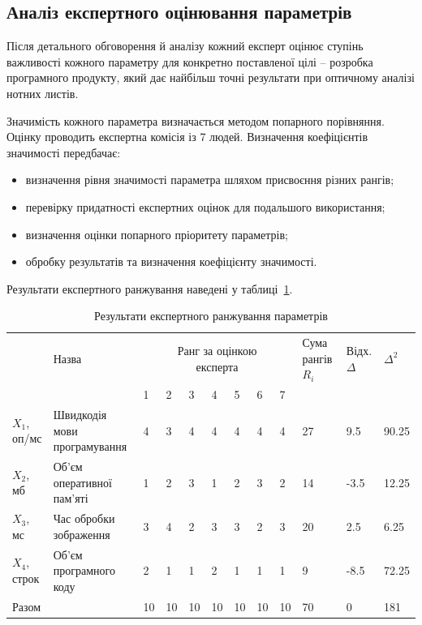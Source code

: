 \subsection{Аналіз експертного оцінювання параметрів}
Після детального обговорення й аналізу кожний експерт оцінює ступінь важливості кожного 
параметру для конкретно поставленої цілі – розробка програмного продукту, який дає найбільш 
точні результати при оптичному аналізі нотних листів.

Значимість кожного параметра визначається методом попарного порівняння. Оцінку проводить експертна комісія із 7 людей. Визначення коефіцієнтів значимості передбачає: 
\begin{itemize}
	\item визначення рівня значимості параметра шляхом присвоєння різних рангів; 
	\item перевірку придатності експертних оцінок для подальшого використання; 
	\item визначення оцінки попарного пріоритету параметрів; 
	\item обробку результатів та визначення коефіцієнту значимості. 
\end{itemize}

Результати експертного ранжування наведені у таблиці~\ref{tab:economics:parameter_range}.

\begin{table}
	\caption{Результати експертного ранжування параметрів}
	\centering
	\begin{tabular}{| m{} | p{} | m{} | m{} | m{} | m{} | m{} | m{} | m{} |	p{}|p{}|p{}|}
	\hline
	\multirow{2}{*}{\rotatebox{90}{Позначення  }} & Назва & \multicolumn{7}{c|}{\parbox[c]{0.3\textwidth}{Ранг за оцінкою\\експерта}} 	& Сума рангів $R_i$ & Відх. $\Delta$ &$\Delta^2 $ \\
	\cline{3-9}
			   & 	   & 1& 2& 3& 4& 5& 6& 7							&					&					&\\ 
	\hline
	$X_1$, оп/мс & Швидкодія мови програмування 	& 4& 3& 4& 4& 4& 4& 4& 27& 9.5 	& 90.25 \\
	\hline
	$X_2$, мб	& Об'єм оперативної пам'яті 	& 1& 2& 3& 1& 2& 3& 2& 14& -3.5	& 12.25 \\ 
	\hline
	$X_3$, мс	& Час обробки зображення		& 3& 4& 2& 3& 3& 2& 3& 20& 2.5 & 6.25\\
	\hline
	$X_4$, строк & Об'єм програмного коду		& 2& 1& 1& 2& 1& 1& 1& 9& -8.5& 72.25\\
	\hline
	Разом		& 								&10&10&10&10&10&10&10& 70 & 0 & 181\\
	\hline
	\end{tabular}
	\label{tab:economics:parameter_range}
\end{table}


